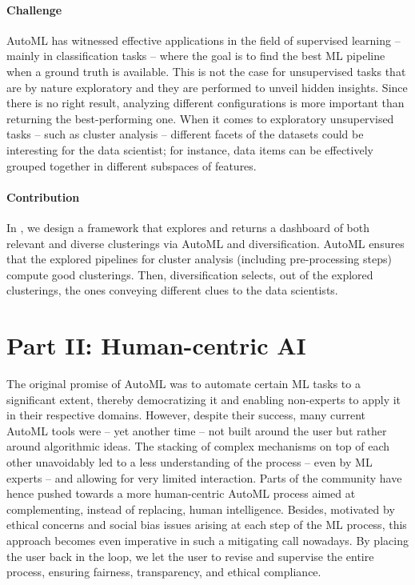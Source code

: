 \paragraph{Challenge}
AutoML has witnessed effective applications in the field of supervised learning -- mainly in classification tasks --  where the goal is to find the best ML pipeline when a ground truth is available.
This is not the case for unsupervised tasks that are by nature exploratory and they are performed to unveil hidden insights.
Since there is no right result, analyzing different configurations is more important than returning the best-performing one.
When it comes to exploratory unsupervised tasks -- such as cluster analysis --  different facets of the datasets could be interesting for the data scientist; for instance, data items can be effectively grouped together in different subspaces of features.

\paragraph{Contribution}
In , we design a framework that explores and returns a dashboard of both relevant and diverse clusterings via AutoML and diversification.
AutoML ensures that the explored pipelines for cluster analysis (including pre-processing steps) compute good clusterings.
Then, diversification selects, out of the explored clusterings, the ones conveying different clues to the data scientists.

\section*{Part II: Human-centric AI}

The original promise of AutoML was to automate certain ML tasks to a significant extent, thereby democratizing it and enabling non-experts to apply it in their respective domains.
However, despite their success, many current AutoML tools were -- yet another time -- not built around the user but rather around algorithmic ideas.
The stacking of complex mechanisms on top of each other unavoidably led to a less understanding of the process -- even by ML experts -- and allowing for very limited interaction.
Parts of the community have hence pushed towards a more human-centric AutoML process aimed at complementing, instead of replacing, human intelligence.
Besides, motivated by ethical concerns and social bias issues arising at each step of the ML process, this approach becomes even imperative in such a mitigating call nowadays.
By placing the user back in the loop, we let the user to revise and supervise the entire process, ensuring fairness, transparency, and ethical compliance.

